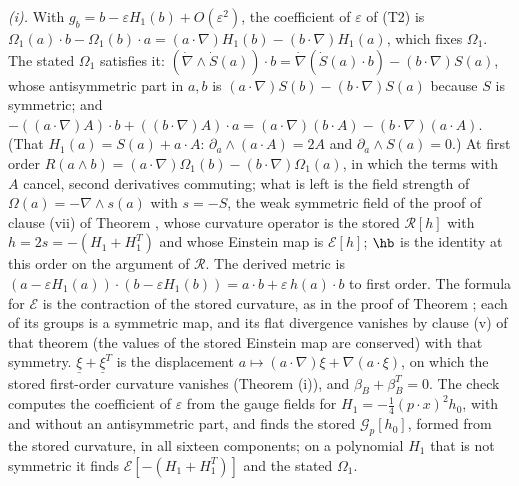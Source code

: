 \emph{(i).} With $g_{b} = b - \varepsilon H_{1}(b) + O(\varepsilon^{2})$, the coefficient of $\varepsilon$ of (T2) is $\Omega_{1}(a) \cdot b - \Omega_{1}(b) \cdot a = (a \cdot \nabla)H_{1}(b) - (b \cdot \nabla)H_{1}(a)$, which fixes $\Omega_{1}$. The stated $\Omega_{1}$ satisfies it: $(\dot\nabla \wedge \dot S(a)) \cdot b = \dot\nabla(\dot S(a) \cdot b) - (b \cdot \nabla)S(a)$, whose antisymmetric part in $a, b$ is $(a \cdot \nabla)S(b) - (b \cdot \nabla)S(a)$ because $S$ is symmetric; and $-((a \cdot \nabla)A) \cdot b + ((b \cdot \nabla)A) \cdot a = (a \cdot \nabla)(b \cdot A) - (b \cdot \nabla)(a \cdot A)$. (That $H_{1}(a) = S(a) + a \cdot A$: $\partial_{a} \wedge (a \cdot A) = 2A$ and $\partial_{a} \wedge S(a) = 0$.) At first order $R(a \wedge b) = (a \cdot \nabla)\Omega_{1}(b) - (b \cdot \nabla)\Omega_{1}(a)$, in which the terms with $A$ cancel, second derivatives commuting; what is left is the field strength of $\Omega(a) = -\nabla \wedge s(a)$ with $s = -S$, the weak symmetric field of the proof of clause (vii) of Theorem , whose curvature operator is the stored $\mathcal{R}[h]$ with $h = 2s = -(H_{1} + H_{1}^{T})$ and whose Einstein map is $\mathcal{E}[h]$; $\hb$ is the identity at this order on the argument of $\mathcal{R}$. The derived metric is $(a - \varepsilon H_{1}(a)) \cdot (b - \varepsilon H_{1}(b)) = a \cdot b + \varepsilon\,h(a) \cdot b$ to first order. The formula for $\mathcal{E}$ is the contraction of the stored curvature, as in the proof of Theorem ; each of its groups is a symmetric map, and its flat divergence vanishes by clause (v) of that theorem (the values of the stored Einstein map are conserved) with that symmetry. $\underline{\xi} + \underline{\xi}^{T}$ is the displacement $a \mapsto (a \cdot \nabla)\xi + \nabla(a \cdot \xi)$, on which the stored first-order curvature vanishes (Theorem (i)), and $\beta_{B} + \beta_{B}^{T} = 0$. The check computes the coefficient of $\varepsilon$ from the gauge fields for $H_{1} = -\tfrac14(p \cdot x)^{2}h_{0}$, with and without an antisymmetric part, and finds the stored $\mathcal{G}_{p}[h_{0}]$, formed from the stored curvature, in all sixteen components; on a polynomial $H_{1}$ that is not symmetric it finds $\mathcal{E}[-(H_{1} + H_{1}^{T})]$ and the stated $\Omega_{1}$.

